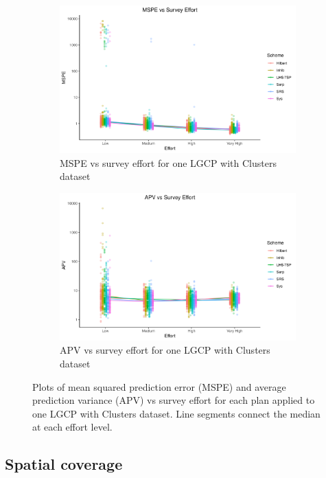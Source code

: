 \documentclass[review]{elsarticle}
\begin{document}
\begin{figure}

\begin{subfigure}{4.5in}
\includegraphics[width=4.5in]{../graphics/MSPE-effort-notpaneled-Cluster000004.png}
\caption{MSPE vs survey effort for one LGCP with Clusters dataset}
\label{mspeclust}
\end{subfigure}

\begin{subfigure}{4.5in}
\includegraphics[width=4.5in]{../graphics/APV-effort-notpaneled-Cluster000004.png}
\caption{APV vs survey effort for one LGCP with Clusters dataset}
\label{apvclust}
\end{subfigure}

\caption{Plots of mean squared prediction error (MSPE) and average prediction
variance (APV) vs survey effort for each plan applied to one LGCP with Clusters
dataset. Line segments connect the median at each effort level.}
\label{clustresults}
\end{figure}


\subsection{Spatial coverage}
\end{document}
